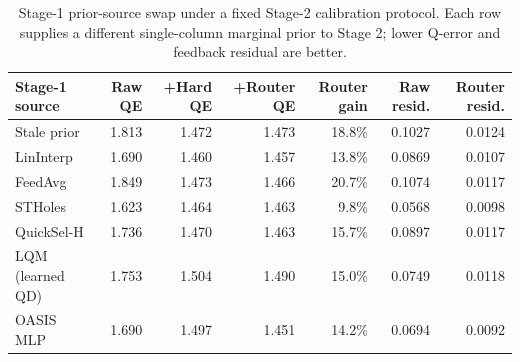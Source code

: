 \begin{table}[t]
  \centering
  \small
  \caption{Stage-1 prior-source swap under a fixed Stage-2 calibration protocol. Each row supplies a different single-column marginal prior to Stage 2; lower Q-error and feedback residual are better.}
  \label{tab:stage1_estimator_swap}
  \setlength{\tabcolsep}{4pt}
  \begin{tabular}{lrrrrrr}
    \toprule
    Stage-1 source & Raw QE & +Hard QE & +Router QE & Router gain & Raw resid. & Router resid. \\
    \midrule
    Stale prior & 1.813 & 1.472 & 1.473 & 18.8\% & 0.1027 & 0.0124 \\
    LinInterp & 1.690 & 1.460 & 1.457 & 13.8\% & 0.0869 & 0.0107 \\
    FeedAvg & 1.849 & 1.473 & 1.466 & 20.7\% & 0.1074 & 0.0117 \\
    STHoles & 1.623 & 1.464 & 1.463 & 9.8\% & 0.0568 & 0.0098 \\
    QuickSel-H & 1.736 & 1.470 & 1.463 & 15.7\% & 0.0897 & 0.0117 \\
    LQM (learned QD) & 1.753 & 1.504 & 1.490 & 15.0\% & 0.0749 & 0.0118 \\
    OASIS MLP & 1.690 & 1.497 & 1.451 & 14.2\% & 0.0694 & 0.0092 \\
    \bottomrule
  \end{tabular}
\end{table}

